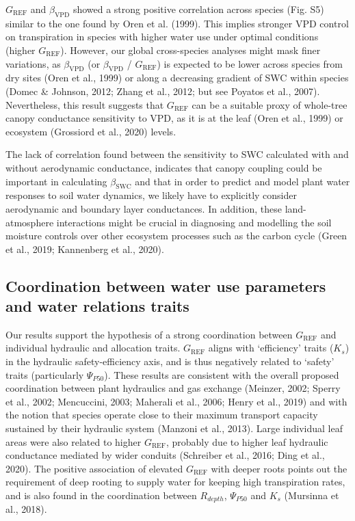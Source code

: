 \documentclass[11pt,twoside]{reedthesis}
\begin{document}
\(G_{\text{REF}}\) and \(\beta_{\text{VPD}}\) showed a strong positive
correlation across species (Fig. S5) similar to the one found by Oren et
al. (1999). This implies stronger VPD control on transpiration in
species with higher water use under optimal conditions (higher
\(G_{\text{REF}}\)). However, our global cross-species analyses might
mask finer variations, as \(\beta_{\text{VPD}}\) (or
\(\beta_{\text{VPD}}\) / \(G_{\text{REF}}\)) is expected to be lower
across species from dry sites (Oren et al., 1999) or along a decreasing
gradient of SWC within species (Domec \& Johnson, 2012; Zhang et al.,
2012; but see Poyatos et al., 2007). Nevertheless, this result suggests
that \(G_{\text{REF}}\) can be a suitable proxy of whole-tree canopy
conductance sensitivity to VPD, as it is at the leaf (Oren et al., 1999)
or ecosystem (Grossiord et al., 2020) levels.\par

The lack of correlation found between the sensitivity to SWC calculated
with and without aerodynamic conductance, indicates that canopy coupling
could be important in calculating \(\beta_{\text{SWC}}\) and that in
order to predict and model plant water responses to soil water dynamics,
we likely have to explicitly consider aerodynamic and boundary layer
conductances. In addition, these land-atmosphere interactions might be
crucial in diagnosing and modelling the soil moisture controls over
other ecosystem processes such as the carbon cycle (Green et al., 2019;
Kannenberg et al., 2020).\par

\subsection{Coordination between water use parameters and water
relations
traits}\label{coordination-between-water-use-parameters-and-water-relations-traits}

Our results support the hypothesis of a strong coordination between
\(G_{\text{REF}}\) and individual hydraulic and allocation traits.
\(G_{\text{REF}}\) aligns with `efficiency' traits (\(K_s\)) in the
hydraulic safety-efficiency axis, and is thus negatively related to
`safety' traits (particularly \(\Psi_{P50}\)). These results are
consistent with the overall proposed coordination between plant
hydraulics and gas exchange (Meinzer, 2002; Sperry et al., 2002;
Mencuccini, 2003; Maherali et al., 2006; Henry et al., 2019) and with
the notion that species operate close to their maximum transport
capacity sustained by their hydraulic system (Manzoni et al., 2013).
Large individual leaf areas were also related to higher
\(G_{\text{REF}}\), probably due to higher leaf hydraulic conductance
mediated by wider conduits (Schreiber et al., 2016; Ding et al., 2020).
The positive association of elevated \(G_{\text{REF}}\) with deeper
roots points out the requirement of deep rooting to supply water for
keeping high transpiration rates, and is also found in the coordination
between \(R_{depth}\), \(\Psi_{P50}\) and \(K_s\) (Mursinna et al.,
2018).\par
\end{document}

